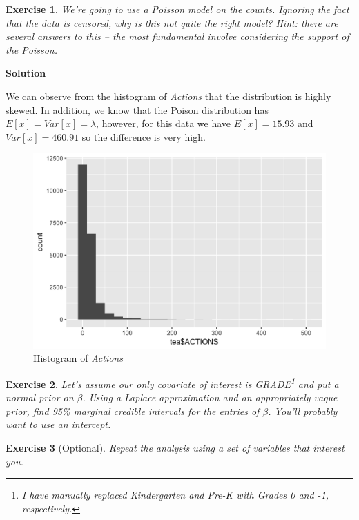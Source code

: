 \documentclass[twoside]{article}
\newcounter{lecnum}
\newtheorem{exercise}{Exercise}[lecnum]
\begin{document}
  \begin{exercise}
    We're going to use a Poisson model on the counts. Ignoring the fact that the data is censored, why is this not quite the right model? \textit{Hint: there are several answers to this -- the most fundamental involve considering the support of the Poisson}.
  \end{exercise}

{\color{blue}
	\textbf{Solution}
	
		We can observe from the histogram of \textit{Actions} that the distribution is highly skewed. In addition, we know that the Poison distribution has $E[x]=Var[x]=\lambda$, however, for this data we have $E[x]=15.93 $ and $Var[x]=460.91$ so the difference is very high.
	
	\begin{figure}[H]
		\begin{center}
			\includegraphics[width=.8\linewidth]{Section3R/Figures/P3_6_hist.png}
			\caption{Histogram of \textit{Actions}}
		\end{center}
	\end{figure}

} %

  
  \begin{exercise}
    Let's assume our only covariate of interest is GRADE\footnote{I have manually replaced Kindergarten and Pre-K with Grades 0 and -1, respectively.} and put a normal prior on $\beta$. Using a Laplace approximation and an appropriately vague prior, find  95\% marginal credible intervals for the entries of $\beta$. You'll probably want to use an intercept.
  \end{exercise}


  \begin{exercise}[Optional]
    Repeat the analysis using a set of variables that interest you.
  \end{exercise}
\end{document}
